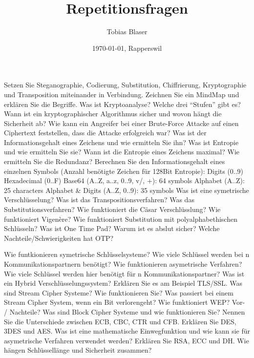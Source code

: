\documentclass[ngerman,a4paper,12pt]{scrreprt}
\title{Repetitionsfragen}
\author{Tobias Blaser}
\date{\today{}, Rapperswil}
\begin{document}
\tableofcontents
\clearpage

\ol
	\li
\olS


\olR
	\li
\olS


\olR
	\li
\olS


\olR
	\li Setzen Sie Steganographie, Codierung, Substitution, Chiffrierung, Kryptographie und Transposition miteinander in Verbindung. Zeichnen Sie ein MindMap und erklären Sie die Begriffe.
	\li Was ist Kryptoanalyse? Welche drei ``Stufen'' gibt es?
	\li Wann ist ein kryptographischer Algorithmus sicher und wovon hängt die Sicherheit ab?
	\li Wie kann ein Angreifer bei einer Brute-Force Attacke auf einen Ciphertext feststellen, dass die Attacke erfolgreich war?
	\li Was ist der Informationsgehalt eines Zeichens und wie ermitteln Sie ihn?
	\li Was ist Entropie und wie ermitteln Sie sie? Wann ist die Entropie eines Zeichens maximal?
	\li Wie ermitteln Sie die Redundanz?
	\li Berechnen Sie den Informationsgehalt eines einzelnen Symbols (Anzahl benötigte
Zeichen für 128Bit Entropie):
		\ol
			\li Digits (0..9)
			\li Hexadecimal (0..F)
			\li Base64 (A..Z, a..z, 0..9, v/, +): 64 symbols
			\li Alphabet (A..Z): 25 characters
			\li Alphabet \& Digits (A..Z, 0..9): 35 symbols
		\olE
	\li Was ist eine symetrische Verschlüsselung?
	\li Was ist das Transpositionsverfahren? Was das Substitutionsverfahren? Wie funktioniert die Cäsar Verschlüsslung?
	\li Wie funktioniert Vigenère? Wie funktioniert Substitution mit polyalphabethischen Schlüsseln?
	\li Was ist One Time Pad? Warum ist es abslut sicher? Welche Nachteile/Schwierigkeiten hat OTP?	
\olS


\olR
	\li Wie funtkionieren symetrische Schlüsselsysteme? Wie viele Schlüssel werden bei n Kommunikationspartnern benötigt?
	\li Wie funktionieren asymetrische Verfahren? Wie viele Schlüssel werden hier benötigt für n Kommunikationspartner?
	\li Was ist ein Hybrid Verschlüsselungssystem? Erklären Sie es am Beispiel TLS/SSL.
	\li Was sind Stream Cipher Systeme? Wie funktionieren Sie?
	\li Was passiert bei einem Stream Cipher System, wenn ein Bit verlorengeht?
	\li Wie funktioniert WEP? Vor- / Nachteile?
	\li Was sind Block Cipher Systeme und wie funktionieren Sie?
	\li Nennen Sie die Unterschiede zwischen ECB, CBC, CTR und CFB.
	\li Erklären Sie DES, 3DES und AES.
	\li Was ist eine mathematische Einwegfunktion und wie kann sie für asymetrische Verfahren verwendet werden?
	\li Erklären Sie RSA, ECC und DH.
	\li Wie hängen Schlüssellänge und Sicherheit zusammen?
\olS
\end{document}
